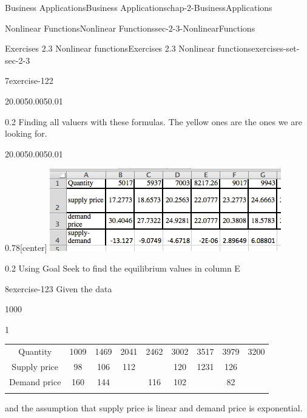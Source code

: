 \documentclass[oneside,10pt,]{book}
\numberwithin{equation}{section}
\newcommand{\hrulethin}  {\noalign{\hrule height 0.04em}}
\newcommand{\hrulemedium}{\noalign{\hrule height 0.07em}}
\newcommand{\hrulethick} {\noalign{\hrule height 0.11em}}
\begin{document}
\begin{chapterptx}{Business Applications}{}{Business Applications}{}{}{chap-2-BusinessApplications}
\begin{sectionptx}{Nonlinear Functions}{}{Nonlinear Functions}{}{}{sec-2-3-NonlinearFunctions}
\begin{exercises-subsection-numberless}{Exercises 2.3 Nonlinear functions}{}{Exercises 2.3 Nonlinear functions}{}{}{exercises-set-sec-2-3}
\begin{exercisegroup}
\begin{divisionexerciseeg}{7}{}{}{exercise-122}
\begin{sidebyside}{2}{0.005}{0.005}{0.01}
\begin{sbspanel}{0.2}%
\hypertarget{p-835}{}%
Finding all valuers with these formulas.  The yellow ones are the ones we are looking for.%
\end{sbspanel}%
\end{sidebyside}%
\begin{sidebyside}{2}{0.005}{0.005}{0.01}%
\begin{sbspanel}{0.78}[center]%
\includegraphics[width=1\linewidth]{images/sec2-3-sol7d.png}
\end{sbspanel}%
\begin{sbspanel}{0.2}%
\hypertarget{p-836}{}%
Using Goal Seek to find the equilibrium values in column E%
\end{sbspanel}%
\end{sidebyside}%
\end{divisionexerciseeg}%
\begin{divisionexerciseeg}{8}{}{}{exercise-123}%
\hypertarget{p-837}{}%
Given the data%
\begin{sidebyside}{1}{0}{0}{0}%
\begin{sbspanel}{1}%
{\centering%
\begin{tabular}{ccccccccc}\hrulethick
Quantity&1009&1469&2041&2462&3002&3517&3979&3200\tabularnewline\hrulethin
Supply price&98&106&112&&120&1231&126&\tabularnewline\hrulemedium
Demand price&160&144&&116&102&&82&\tabularnewline\hrulemedium
\end{tabular}
\par}
\end{sbspanel}%
\end{sidebyside}%
\par
\hypertarget{p-838}{}%
and the assumption that supply price is linear and demand price is exponential.%
\end{divisionexerciseeg}%
\end{exercisegroup}
\par\medskip\noindent
\par\medskip\noindent%
\hypertarget{exercisegroup-11}{}%
\hypertarget{p-839}{}%

\end{exercises-subsection-numberless}
\end{sectionptx}
\end{chapterptx}
\end{document}
